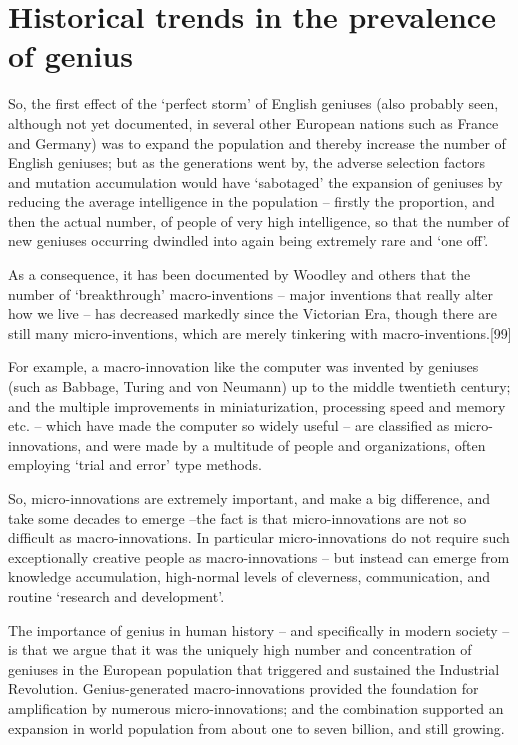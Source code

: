 \documentclass[
]{book}
\begin{document}
\hypertarget{historical-trends-in-the-prevalence-of-genius}{%
\section{Historical trends in the prevalence of genius}\label{historical-trends-in-the-prevalence-of-genius}}

So, the first effect of the `perfect storm' of English geniuses (also probably seen, although not yet documented, in several other European nations such as France and Germany) was to expand the population and thereby increase the number of English geniuses; but as the generations went by, the adverse selection factors and mutation accumulation would have `sabotaged' the expansion of geniuses by reducing the average intelligence in the population -- firstly the proportion, and then the actual number, of people of very high intelligence, so that the number of new geniuses occurring dwindled into again being extremely rare and `one off'.

As a consequence, it has been documented by Woodley and others that the number of `breakthrough' macro-inventions -- major inventions that really alter how we live -- has decreased markedly since the Victorian Era, though there are still many micro-inventions, which are merely tinkering with macro-inventions.{[}99{]}

For example, a macro-innovation like the computer was invented by geniuses (such as Babbage, Turing and von Neumann) up to the middle twentieth century; and the multiple improvements in miniaturization, processing speed and memory etc. -- which have made the computer so widely useful -- are classified as micro-innovations, and were made by a multitude of people and organizations, often employing `trial and error' type methods.

So, micro-innovations are extremely important, and make a big difference, and take some decades to emerge --the fact is that micro-innovations are not so difficult as macro-innovations. In particular micro-innovations do not require such exceptionally creative people as macro-innovations -- but instead can emerge from knowledge accumulation, high-normal levels of cleverness, communication, and routine `research and development'.

The importance of genius in human history -- and specifically in modern society -- is that we argue that it was the uniquely high number and concentration of geniuses in the European population that triggered and sustained the Industrial Revolution. Genius-generated macro-innovations provided the foundation for amplification by numerous micro-innovations; and the combination supported an expansion in world population from about one to seven billion, and still growing.
\end{document}
